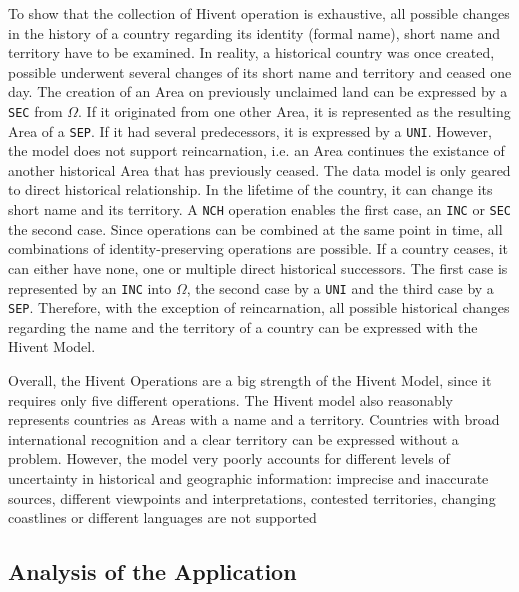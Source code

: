 To show that the collection of Hivent operation is exhaustive, all possible changes in the history of a country regarding its identity (formal name), short name and territory have to be examined. In reality, a historical country was once created, possible underwent several changes of its short name and territory and ceased one day. The creation of an Area on previously unclaimed land can be expressed by a \texttt{SEC} from $\Omega$. If it originated from one other Area, it is represented as the resulting Area of a \texttt{SEP}. If it had several predecessors, it is expressed by a \texttt{UNI}. However, the model does not support reincarnation, i.e. an Area continues the existance of another historical Area that has previously ceased. The data model is only geared to direct historical relationship. In the lifetime of the country, it can change its short name and its territory. A \texttt{NCH} operation enables the first case, an \texttt{INC} or \texttt{SEC} the second case. Since operations can be combined at the same point in time, all combinations of identity-preserving operations are possible. If a country ceases, it can either have none, one or multiple direct historical successors. The first case is represented by an \texttt{INC} into $\Omega$, the second case by a \texttt{UNI} and the third case by a \texttt{SEP}. Therefore, with the exception of reincarnation, all possible historical changes regarding the name and the territory of a country can be expressed with the Hivent Model.


Overall, the Hivent Operations are a big strength of the Hivent Model, since it requires only five different operations.
The Hivent model also reasonably represents countries as Areas with a name and a territory. Countries with broad international recognition and a clear territory can be expressed without a problem. However, the model very poorly accounts for different levels of uncertainty in historical and geographic information: imprecise and inaccurate sources, different viewpoints and interpretations, contested territories, changing coastlines or different languages are not supported



\subsection{Analysis of the Application} %
\label{sub:application}

